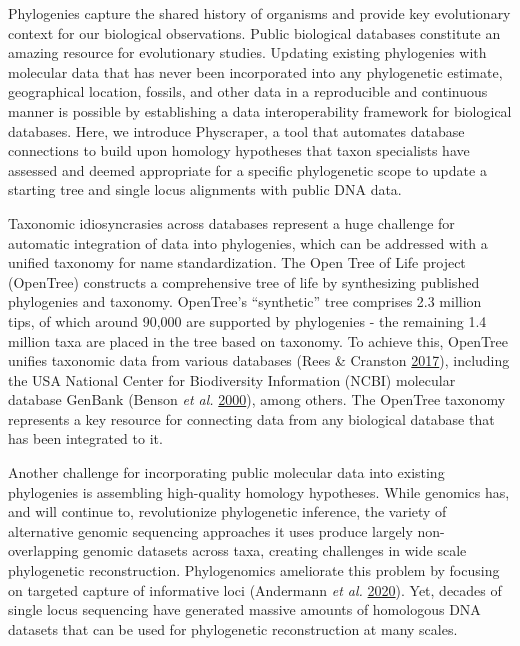 \documentclass[]{article}
\begin{document}
Phylogenies capture the shared history of organisms and provide key evolutionary context for our biological observations.
Public biological databases constitute an amazing resource for evolutionary studies. Updating existing phylogenies with molecular data that has never been incorporated into any phylogenetic estimate, geographical location, fossils, and other data in a reproducible and continuous manner is possible by establishing a data interoperability framework for biological databases. Here, we introduce Physcraper, a tool that automates database connections to build upon homology hypotheses that taxon specialists have assessed and deemed appropriate for a specific phylogenetic scope to update a starting tree and single locus alignments with public DNA data.

Taxonomic idiosyncrasies across databases represent a huge challenge for automatic integration of data into phylogenies, which can be addressed with a unified taxonomy for name standardization. The Open Tree of Life project (OpenTree)
constructs a comprehensive tree of life by synthesizing published phylogenies and taxonomy. OpenTree's ``synthetic'' tree comprises 2.3 million tips, of which around 90,000 are supported by phylogenies - the remaining 1.4 million taxa are placed in the tree based on taxonomy. To achieve this, OpenTree unifies taxonomic data from various databases (Rees \& Cranston \protect\hyperlink{ref-rees2017automated}{2017}), including the USA National Center for Biodiversity Information (NCBI) molecular database GenBank (Benson \emph{et al.} \protect\hyperlink{ref-benson2000genbank}{2000}), among others. The OpenTree taxonomy represents a key resource for connecting data from any biological database that has been integrated to it.

Another challenge for incorporating public molecular data into existing phylogenies is assembling high-quality homology hypotheses.
While genomics has, and will continue to, revolutionize phylogenetic inference, the variety of alternative genomic sequencing approaches it uses produce largely non-overlapping genomic datasets across taxa, creating challenges in wide scale phylogenetic reconstruction.
Phylogenomics ameliorate this problem by focusing on targeted capture of informative loci (Andermann \emph{et al.} \protect\hyperlink{ref-andermann2020guide}{2020}). Yet, decades of single locus sequencing have generated massive amounts of homologous DNA datasets that can be used for phylogenetic reconstruction at many scales.
\end{document}
